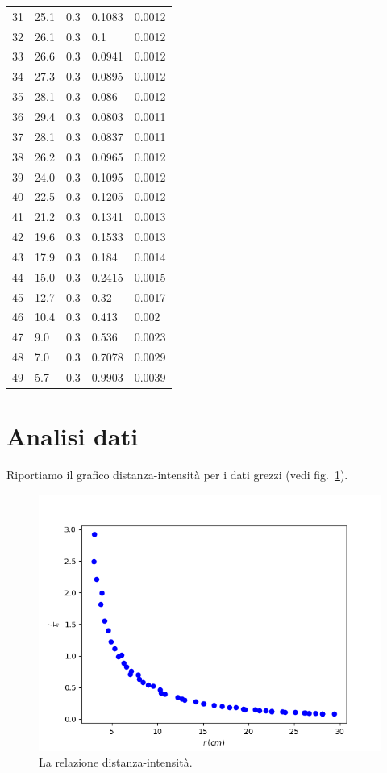 \documentclass[11pt]{article}
\makeatletter
\def\maxwidth{\ifdim\Gin@nat@width>\linewidth\linewidth
    \else\Gin@nat@width\fi}
\let\Oldincludegraphics\includegraphics
\renewcommand{\includegraphics}[1]{\Oldincludegraphics[width=.8\maxwidth]{#1}}
\makeatother
\begin{document}
\begin{tabularx}{\textwidth}{XXXXX}
31 & 25.1 & 0.3 & 0.1083 & 0.0012\\
32 & 26.1 & 0.3 & 0.1 & 0.0012\\
33 & 26.6 & 0.3 & 0.0941 & 0.0012\\
34 & 27.3 & 0.3 & 0.0895 & 0.0012\\
35 & 28.1 & 0.3 & 0.086 & 0.0012\\
36 & 29.4 & 0.3 & 0.0803 & 0.0011\\
37 & 28.1 & 0.3 & 0.0837 & 0.0011\\
38 & 26.2 & 0.3 & 0.0965 & 0.0012\\
39 & 24.0 & 0.3 & 0.1095 & 0.0012\\
40 & 22.5 & 0.3 & 0.1205 & 0.0012\\
41 & 21.2 & 0.3 & 0.1341 & 0.0013\\
42 & 19.6 & 0.3 & 0.1533 & 0.0013\\
43 & 17.9 & 0.3 & 0.184 & 0.0014\\
44 & 15.0 & 0.3 & 0.2415 & 0.0015\\
45 & 12.7 & 0.3 & 0.32 & 0.0017\\
46 & 10.4 & 0.3 & 0.413 & 0.002\\
47 & 9.0 & 0.3 & 0.536 & 0.0023\\
48 & 7.0 & 0.3 & 0.7078 & 0.0029\\
49 & 5.7 & 0.3 & 0.9903 & 0.0039\\
\bottomrule
\end{tabularx}

    \hypertarget{analisi-dati}{%
\section{Analisi dati}\label{analisi-dati}}

Riportiamo il grafico distanza-intensit\`a per i dati grezzi (vedi fig.~\ref{fig:data}).

\begin{figure}[H]
  \centering
  \includegraphics{img/data.png}
  \caption{La relazione distanza-intensit\`a.\label{fig:data}}
\end{figure}
\end{document}

